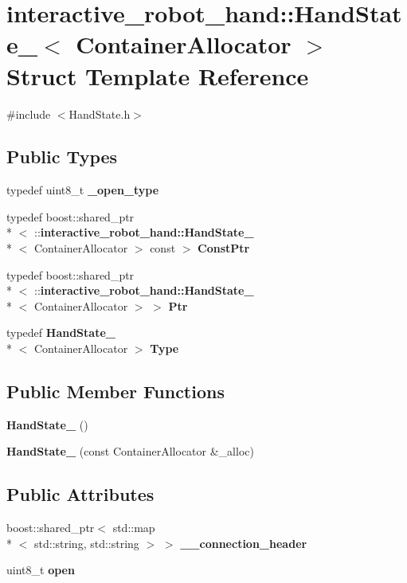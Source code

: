 \section{interactive\-\_\-robot\-\_\-hand\-:\-:Hand\-State\-\_\-$<$ Container\-Allocator $>$ Struct Template Reference}
\label{structinteractive__robot__hand_1_1HandState__}


{\ttfamily \#include $<$Hand\-State.\-h$>$}

\subsection*{Public Types}
\begin{DoxyCompactItemize}
\item 
typedef uint8\-\_\-t {\bf \-\_\-open\-\_\-type}
\item 
typedef boost\-::shared\-\_\-ptr\\*
$<$ \-::{\bf interactive\-\_\-robot\-\_\-hand\-::\-Hand\-State\-\_\-}\\*
$<$ Container\-Allocator $>$ const  $>$ {\bf Const\-Ptr}
\item 
typedef boost\-::shared\-\_\-ptr\\*
$<$ \-::{\bf interactive\-\_\-robot\-\_\-hand\-::\-Hand\-State\-\_\-}\\*
$<$ Container\-Allocator $>$ $>$ {\bf Ptr}
\item 
typedef {\bf Hand\-State\-\_\-}\\*
$<$ Container\-Allocator $>$ {\bf Type}
\end{DoxyCompactItemize}
\subsection*{Public Member Functions}
\begin{DoxyCompactItemize}
\item 
{\bf Hand\-State\-\_\-} ()
\item 
{\bf Hand\-State\-\_\-} (const Container\-Allocator \&\-\_\-alloc)
\end{DoxyCompactItemize}
\subsection*{Public Attributes}
\begin{DoxyCompactItemize}
\item 
boost\-::shared\-\_\-ptr$<$ std\-::map\\*
$<$ std\-::string, std\-::string $>$ $>$ {\bf \-\_\-\-\_\-connection\-\_\-header}
\item 
uint8\-\_\-t {\bf open}
\end{DoxyCompactItemize}


